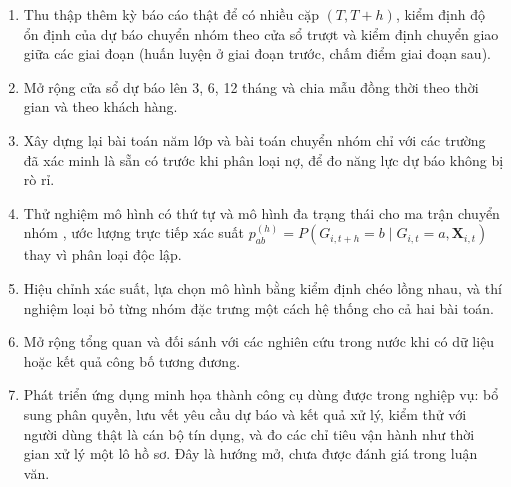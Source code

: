 \begin{enumerate}
    \item Thu thập thêm kỳ báo cáo thật để có nhiều cặp $(T,T+h)$, kiểm định độ ổn định của dự báo chuyển nhóm theo cửa sổ trượt và kiểm định chuyển giao giữa các giai đoạn (huấn luyện ở giai đoạn trước, chấm điểm giai đoạn sau).
    \item Mở rộng cửa sổ dự báo lên 3, 6, 12 tháng và chia mẫu đồng thời theo thời gian và theo khách hàng.
    \item Xây dựng lại bài toán năm lớp và bài toán chuyển nhóm chỉ với các trường đã xác minh là sẵn có trước khi phân loại nợ, để đo năng lực dự báo không bị rò rỉ.
    \item Thử nghiệm mô hình có thứ tự và mô hình đa trạng thái cho ma trận chuyển nhóm \cite{lando2002analyzing}, ước lượng trực tiếp xác suất $p_{ab}^{(h)}=P(G_{i,t+h}=b\mid G_{i,t}=a,\mathbf{X}_{i,t})$ thay vì phân loại độc lập.
    \item Hiệu chỉnh xác suất, lựa chọn mô hình bằng kiểm định chéo lồng nhau, và thí nghiệm loại bỏ từng nhóm đặc trưng một cách hệ thống cho cả hai bài toán.
    \item Mở rộng tổng quan và đối sánh với các nghiên cứu trong nước khi có dữ liệu hoặc kết quả công bố tương đương.
    \item Phát triển ứng dụng minh họa thành công cụ dùng được trong nghiệp vụ: bổ sung phân quyền, lưu vết yêu cầu dự báo và kết quả xử lý, kiểm thử với người dùng thật là cán bộ tín dụng, và đo các chỉ tiêu vận hành như thời gian xử lý một lô hồ sơ. Đây là hướng mở, chưa được đánh giá trong luận văn.
\end{enumerate}
